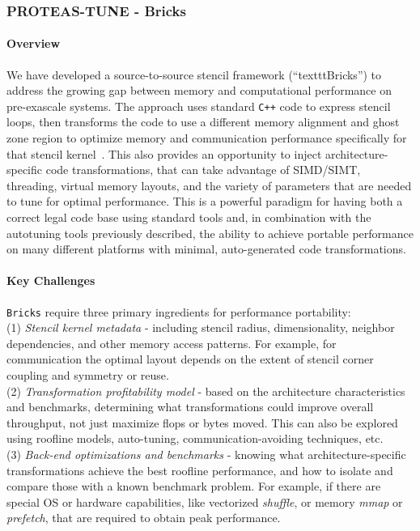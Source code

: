 \subsubsection{ PROTEAS-TUNE - Bricks} 

\paragraph{Overview}
We have developed a source-to-source stencil framework (``texttt{Bricks}'')
  to address the growing gap between memory and computational performance 
  on pre-exascale systems.
The approach uses standard \texttt{C++} code to express stencil loops, 
  then transforms the code to use a different memory alignment and ghost
  zone region to optimize memory and communication performance specifically
  for that stencil kernel~\cite{P3HPC_Bricks,zhao2019,zhaoMPI2019}.
This also provides an opportunity to inject architecture-specific code
  transformations, that can take advantage of SIMD/SIMT, threading,
  virtual memory layouts, and the variety of parameters that are needed to 
  tune for optimal performance.
This is a powerful paradigm for having both a correct legal code base 
  using standard tools and, in combination with the autotuning tools previously described,
  the ability to achieve portable performance on many different 
  platforms with minimal, auto-generated code transformations.

\paragraph{Key Challenges}
\texttt{Bricks} require three primary ingredients for performance portability:
\\
(1) \textit{Stencil kernel metadata} - including stencil radius,
  dimensionality, neighbor dependencies, and other memory access patterns.
  For example, for communication the optimal layout depends on the
  extent of stencil corner coupling and symmetry or reuse.
\\
(2) \textit{Transformation profitability model} - based on the architecture
  characteristics and benchmarks, determining what transformations could
  improve overall throughput, not just maximize flops or bytes moved. 
  This can also be explored using roofline models, auto-tuning, 
  communication-avoiding techniques, etc.
\\
(3) \textit{Back-end optimizations and benchmarks} - knowing what 
  architecture-specific transformations achieve the best roofline performance, 
  and how to isolate and compare those with a known benchmark problem. 
For example, if there
  are special OS or hardware capabilities, like vectorized \textit{shuffle}, 
  or memory \textit{mmap} or \textit{prefetch}, that are required to obtain
  peak performance.

